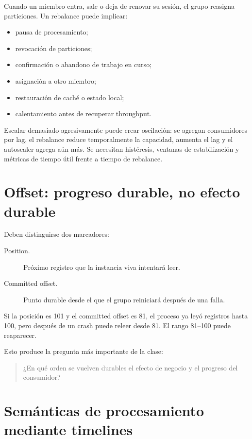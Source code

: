 \documentclass[variant=apuntes,cover=institutional,mode=screen]{ua-engineering-v6-article}
\begin{document}
Cuando un miembro entra, sale o deja de renovar su sesión, el grupo reasigna particiones. Un rebalance puede implicar:

\begin{itemize}
\item pausa de procesamiento;
\item revocación de particiones;
\item confirmación o abandono de trabajo en curso;
\item asignación a otro miembro;
\item restauración de caché o estado local;
\item calentamiento antes de recuperar throughput.
\end{itemize}

Escalar demasiado agresivamente puede crear oscilación: se agregan consumidores por lag, el rebalance reduce temporalmente la capacidad, aumenta el lag y el autoscaler agrega aún más. Se necesitan histéresis, ventanas de estabilización y métricas de tiempo útil frente a tiempo de rebalance.

\section{Offset: progreso durable, no efecto durable}

Deben distinguirse dos marcadores:

\begin{description}
\item[Position.] Próximo registro que la instancia viva intentará leer.
\item[Committed offset.] Punto durable desde el que el grupo reiniciará después de una falla.
\end{description}

Si la posición es 101 y el committed offset es 81, el proceso ya leyó registros hasta 100, pero después de un crash puede releer desde 81. El rango 81--100 puede reaparecer.

Esto produce la pregunta más importante de la clase:

\begin{quote}
¿En qué orden se vuelven durables el efecto de negocio y el progreso del consumidor?
\end{quote}

\section{Semánticas de procesamiento mediante timelines}
\end{document}
